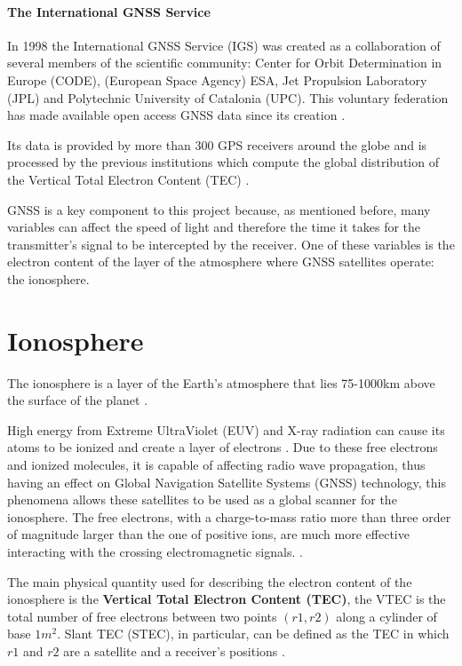 \paragraph{The International GNSS Service}

In 1998 the International GNSS Service (IGS) was created as a collaboration of several members of the scientific community: Center for Orbit Determination in Europe (CODE), (European Space Agency) ESA, Jet Propulsion Laboratory (JPL) and Polytechnic University of Catalonia (UPC). This voluntary federation has made available open access GNSS data since its creation \cite{igswebsite} \cite{dow2009international}. 

Its data is provided by more than 300 GPS receivers around the globe and is processed by the previous institutions which compute the global distribution of the Vertical Total Electron Content (TEC) \cite{hernandez2009igs}.

GNSS is a key component to this project because, as mentioned before, many variables can affect the speed of light and therefore the time it takes for the transmitter's signal to be intercepted by the receiver. One of these variables is the electron content of the layer of the atmosphere where GNSS satellites operate: the ionosphere.

\section{Ionosphere}

The ionosphere is a layer of the Earth’s atmosphere that lies 75-1000km above the surface of the planet \cite{ionospherestandford}. 

High energy from Extreme UltraViolet (EUV) and X-ray radiation can cause its atoms to be ionized and create a layer of electrons \cite{noaa2ionosphere}. Due to these free electrons and ionized molecules, it is capable of affecting radio wave propagation, thus having an effect on Global Navigation Satellite Systems (GNSS) technology, this phenomena allows these satellites to be used as a global scanner for the ionosphere. The free electrons, with a charge-to-mass ratio more than three order of magnitude larger than the one of positive ions, are much more effective interacting with the crossing electromagnetic signals. \cite{hernandez2011ionosphere}.

The main physical quantity used for describing the electron content of the ionosphere is the \textbf{Vertical Total Electron Content (TEC)}, the VTEC is the total number of free electrons between two points $(r1,r2)$ along a cylinder of base $1m^2$. 
Slant TEC (STEC), in particular, can be defined as the TEC in which $r1$ and $r2$ are a satellite and a receiver’s positions \cite{singh2015gps}. 

